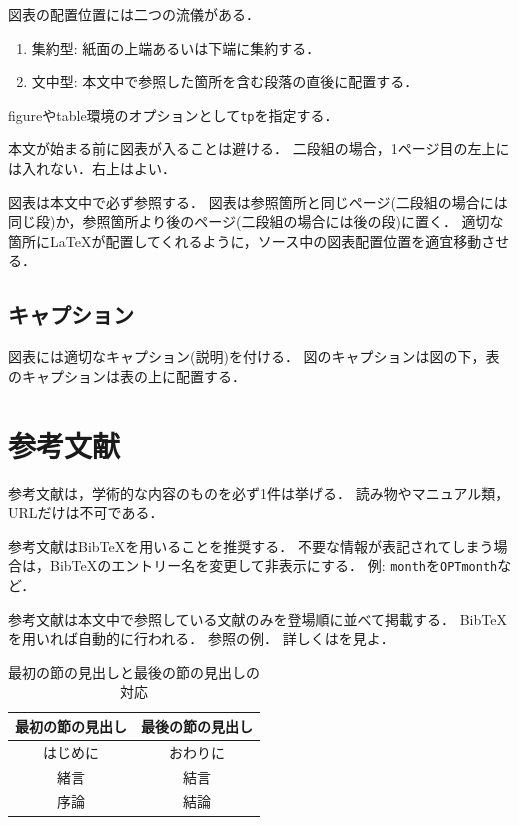 \documentclass[paper=a4paper,fontsize=10pt,jafontscale=0.925,twocolumn]{jlreq}
\begin{document}
図表の配置位置には二つの流儀がある．
\begin{enumerate}
 \item 集約型: 紙面の上端あるいは下端に集約する．
 \item 文中型: 本文中で参照した箇所を含む段落の直後に配置する．
\end{enumerate}
figureやtable環境のオプションとして\verb|tp|を指定する．

本文が始まる前に図表が入ることは避ける．
二段組の場合，1ページ目の左上には入れない．右上はよい．


図表は本文中で必ず参照する．
図表は参照箇所と同じページ(二段組の場合には同じ段)か，参照箇所より後のページ(二段組の場合には後の段)に置く．
適切な箇所に\LaTeX{}が配置してくれるように，ソース中の図表配置位置を適宜移動させる．

\subsection{キャプション}

図表には適切なキャプション(説明)を付ける．
図のキャプションは図の下，表のキャプションは表の上に配置する．

\section{参考文献}

参考文献は，学術的な内容のものを必ず1件は挙げる．
読み物やマニュアル類，URLだけは不可である．

参考文献はBibTeXを用いることを推奨する．
不要な情報が表記されてしまう場合は，BibTeXのエントリー名を変更して非表示にする．
例: \verb|month|を\verb|OPTmonth|など．

参考文献は本文中で参照している文献のみを登場順に並べて掲載する．
BibTeXを用いれば自動的に行われる．
参照の例\cite{Gao2018}．
詳しくは\cite{Okumura2017}を見よ．

\begin{table}[tp]
 \centering
 \caption{最初の節の見出しと最後の節の見出しの対応}
 \begin{tabular}{c|c} \hline
  最初の節の見出し & 最後の節の見出し \\ \hline
  はじめに & おわりに \\
  緒言 & 結言 \\
  序論 & 結論 \\ \hline
 \end{tabular}
 \label{table:section_name}
\end{table}
\end{document}

